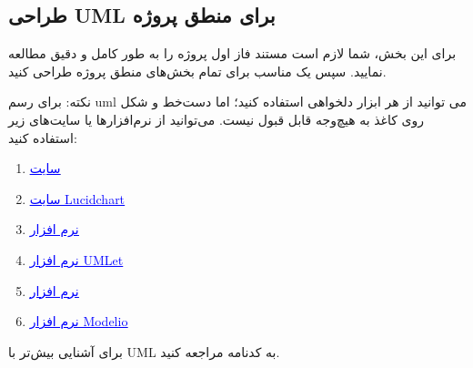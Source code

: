 \documentclass[]{article}
\begin{document}
\subsection*{{\titr طراحی UML برای منطق پروژه}}
\label{subsec:uml}

برای این بخش، شما لازم است مستند فاز اول پروژه را به طور کامل و دقیق مطالعه نمایید. سپس یک  مناسب برای تمام بخش‌های منطق پروژه طراحی کنید.

نکته: برای رسم uml می توانید از هر ابزار دلخواهی استفاده کنید؛ اما دست‌خط و شکل روی کاغذ به هیچ‌وجه قابل قبول نیست. می‌توانید از نرم‌افزارها یا سایت‌های زیر استفاده کنید:

\begin{enumerate}
	
	\item
	
	\href{https://app.diagrams.net/}{\textcolor{blue}{\underline{سایت }}} 
	
	\item
	
	\href{https://www.lucidchart.com/pages/}{\textcolor{blue}{\underline{سایت Lucidchart}}} 
	
	
	\item
	
	\href{https://products.office.com/en/visio/flowchart-software}{\textcolor{blue}{\underline{نرم افزار }}} 
	
	
	\item
	
	\href{https://www.umlet.com/changes.htm}{\textcolor{blue}{\underline{نرم افزار UMLet}}} 
	
	
	\item
	
	\href{https://online.visual-paradigm.com/}{\textcolor{blue}{\underline{نرم افزار }}} 
	
	
	\item
	
	\href{https://www.modelio.org/}{\textcolor{blue}{\underline{نرم افزار Modelio}}} 
	
	

	
	
	
\end{enumerate}


برای آشنایی بیش‌تر با UML به کدنامه مراجعه کنید.
\end{document}
